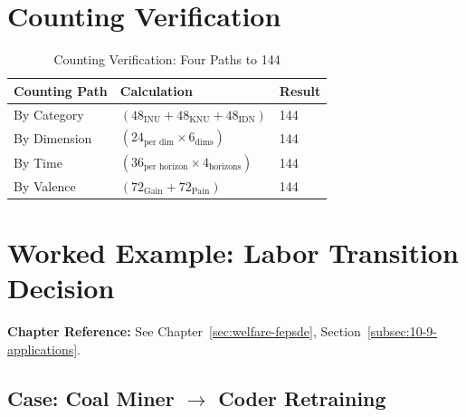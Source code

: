\section{Counting Verification}
\label{sec:app-c-counting}

\begin{table}[htbp]
\centering
\caption{Counting Verification: Four Paths to 144}
\label{tab:app-c-counting}
\renewcommand{\arraystretch}{1.3}
\begin{tabular}{@{}lll@{}}
\toprule
\textbf{Counting Path} & \textbf{Calculation} & \textbf{Result} \\
\midrule
By Category & $(48_{\text{INU}} + 48_{\text{KNU}} + 48_{\text{IDN}})$ & 144 \\
By Dimension & $(24_{\text{per dim}} \times 6_{\text{dims}})$ & 144 \\
By Time & $(36_{\text{per horizon}} \times 4_{\text{horizons}})$ & 144 \\
By Valence & $(72_{\text{Gain}} + 72_{\text{Pain}})$ & 144 \\
\bottomrule
\end{tabular}
\end{table}

\section{Worked Example: Labor Transition Decision}
\label{sec:app-c-example}

\begin{cross-reference}
\textbf{Chapter Reference:} See Chapter~\ref{sec:welfare-fepsde}, 
Section~\ref{subsec:10-9-applications}.
\end{cross-reference}

\subsection{Case: Coal Miner $\to$ Coder Retraining}

